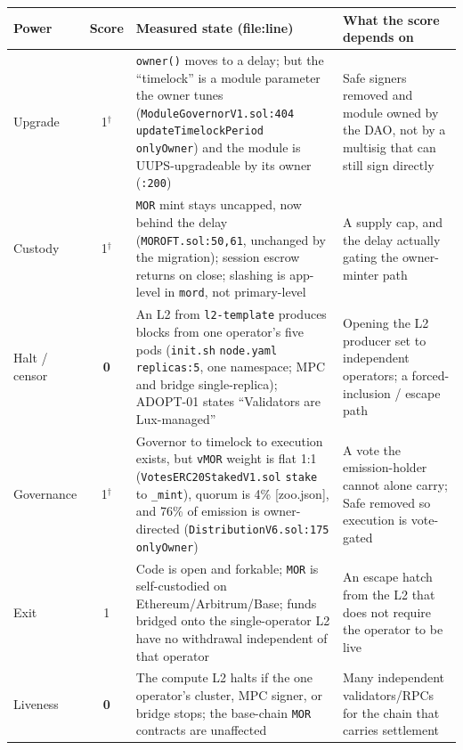 \documentclass[11pt,a4paper]{article}
\newcommand{\code}[1]{\texttt{\small #1}}
\newcommand{\pv}[1]{{\color{muted}\sffamily\scriptsize[#1]}}
\newcommand{\cond}{$^{\dagger}$}
\begin{document}
\begin{table}[h]\footnotesize\setlength{\tabcolsep}{5pt}\renewcommand{\arraystretch}{1.2}
\begin{tabularx}{\linewidth}{@{}l c Y Y@{}}
\toprule
\textbf{Power} & \textbf{Score} & \textbf{Measured state (file:line)} & \textbf{What the score depends on}\\
\midrule
Upgrade & 1\cond & \code{owner()} moves to a delay; but the ``timelock'' is a module parameter the owner tunes (\code{ModuleGovernorV1.sol:404} \code{updateTimelockPeriod onlyOwner}) and the module is UUPS-upgradeable by its owner (\code{:200}) & Safe signers removed and module owned by the DAO, not by a multisig that can still sign directly\\
Custody & 1\cond & \code{MOR} mint stays uncapped, now behind the delay (\code{MOROFT.sol:50,61}, unchanged by the migration); session escrow returns on close; slashing is app-level in \code{mord}, not primary-level & A supply cap, and the delay actually gating the owner-minter path\\
Halt / censor & \textbf{0} & An L2 from \code{l2-template} produces blocks from one operator's five pods (\code{init.sh} \code{node.yaml replicas:5}, one namespace; MPC and bridge single-replica); ADOPT-01 states ``Validators are Lux-managed'' & Opening the L2 producer set to independent operators; a forced-inclusion / escape path\\
Governance & 1\cond & Governor to timelock to execution exists, but \code{vMOR} weight is flat 1:1 (\code{VotesERC20StakedV1.sol} \code{stake} to \code{\_mint}), quorum is 4\% \pv{zoo.json}, and 76\% of emission is owner-directed (\code{DistributionV6.sol:175} \code{onlyOwner}) & A vote the emission-holder cannot alone carry; Safe removed so execution is vote-gated\\
Exit & 1 & Code is open and forkable; \code{MOR} is self-custodied on Ethereum/Arbitrum/Base; funds bridged onto the single-operator L2 have no withdrawal independent of that operator & An escape hatch from the L2 that does not require the operator to be live\\
Liveness & \textbf{0} & The compute L2 halts if the one operator's cluster, MPC signer, or bridge stops; the base-chain \code{MOR} contracts are unaffected & Many independent validators/RPCs for the chain that carries settlement\\
\bottomrule
\end{tabularx}
\end{table}
\end{document}
